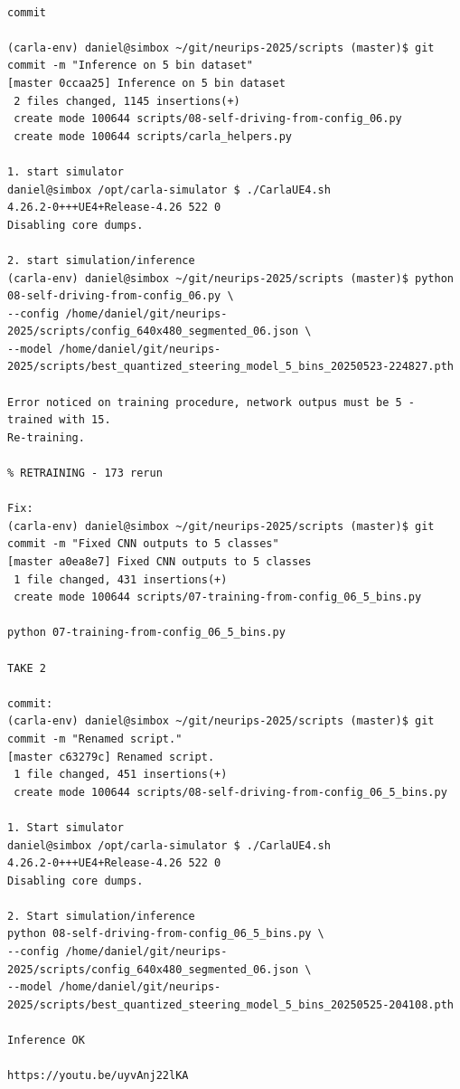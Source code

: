 \begin{verbatim}

commit 

(carla-env) daniel@simbox ~/git/neurips-2025/scripts (master)$ git commit -m "Inference on 5 bin dataset"
[master 0ccaa25] Inference on 5 bin dataset
 2 files changed, 1145 insertions(+)
 create mode 100644 scripts/08-self-driving-from-config_06.py
 create mode 100644 scripts/carla_helpers.py
 
1. start simulator
daniel@simbox /opt/carla-simulator $ ./CarlaUE4.sh 
4.26.2-0+++UE4+Release-4.26 522 0
Disabling core dumps.

2. start simulation/inference
(carla-env) daniel@simbox ~/git/neurips-2025/scripts (master)$ python 08-self-driving-from-config_06.py \
--config /home/daniel/git/neurips-2025/scripts/config_640x480_segmented_06.json \
--model /home/daniel/git/neurips-2025/scripts/best_quantized_steering_model_5_bins_20250523-224827.pth

Error noticed on training procedure, network outpus must be 5 - trained with 15.
Re-training.

% RETRAINING - 173 rerun

Fix:
(carla-env) daniel@simbox ~/git/neurips-2025/scripts (master)$ git commit -m "Fixed CNN outputs to 5 classes"
[master a0ea8e7] Fixed CNN outputs to 5 classes
 1 file changed, 431 insertions(+)
 create mode 100644 scripts/07-training-from-config_06_5_bins.py

python 07-training-from-config_06_5_bins.py

TAKE 2

commit:
(carla-env) daniel@simbox ~/git/neurips-2025/scripts (master)$ git commit -m "Renamed script."
[master c63279c] Renamed script.
 1 file changed, 451 insertions(+)
 create mode 100644 scripts/08-self-driving-from-config_06_5_bins.py
 
1. Start simulator
daniel@simbox /opt/carla-simulator $ ./CarlaUE4.sh 
4.26.2-0+++UE4+Release-4.26 522 0
Disabling core dumps.

2. Start simulation/inference
python 08-self-driving-from-config_06_5_bins.py \
--config /home/daniel/git/neurips-2025/scripts/config_640x480_segmented_06.json \
--model /home/daniel/git/neurips-2025/scripts/best_quantized_steering_model_5_bins_20250525-204108.pth

Inference OK

https://youtu.be/uyvAnj22lKA

\end{verbatim}

